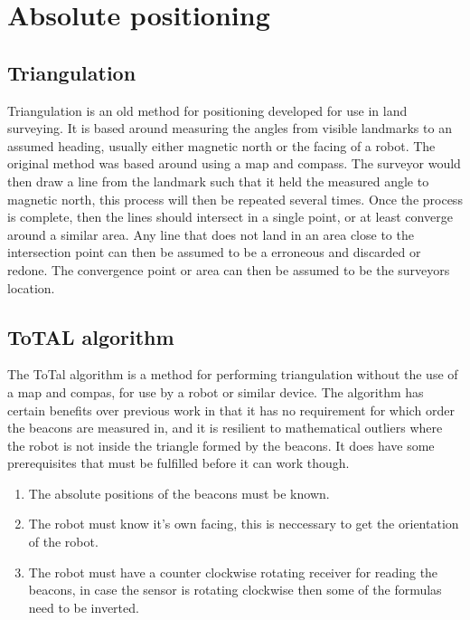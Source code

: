 \section{Absolute positioning}

\subsection{Triangulation}

Triangulation is an old method for positioning developed for use in land surveying. It is based around measuring the angles from visible landmarks to an assumed heading, usually either magnetic north or the facing of a robot. The original method was based around using a map and compass. The surveyor would then draw a line from the landmark such that it held the measured angle to magnetic north, this process will then be repeated several times. Once the process is complete, then the lines should intersect in a single point, or at least converge around a similar area. Any line that does not land in an area close to the intersection point can then be assumed to be a erroneous and discarded or redone. The convergence point or area can then be assumed to be the surveyors location.

\subsection{ToTAL algorithm}

The ToTal algorithm is a method for performing triangulation without the use of a map and compas, for use by a robot or similar device. The algorithm has certain benefits over previous work in that it has no requirement for which order the beacons are measured in, and it is resilient to mathematical outliers where the robot is not inside the triangle formed by the beacons. It does have some prerequisites that must be fulfilled before it can work though. 

\begin{enumerate}
\item The absolute positions of the beacons must be known. 
\item The robot must know it's own facing, this is neccessary to get the orientation of the robot. 
\item The robot must have a counter clockwise rotating receiver for reading the beacons, in case the sensor is rotating clockwise then some of the formulas need to be inverted.
\end{enumerate}

